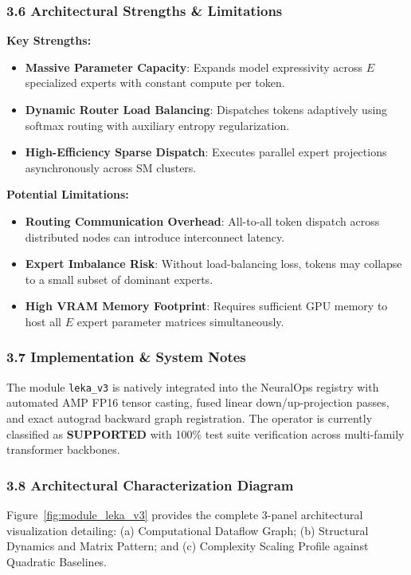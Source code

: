 \subsubsection*{3.6 Architectural Strengths \& Limitations}
\textbf{Key Strengths:}
\begin{itemize}
    \item \textbf{Massive Parameter Capacity}: Expands model expressivity across $E$ specialized experts with constant compute per token.
    \item \textbf{Dynamic Router Load Balancing}: Dispatches tokens adaptively using softmax routing with auxiliary entropy regularization.
    \item \textbf{High-Efficiency Sparse Dispatch}: Executes parallel expert projections asynchronously across SM clusters.
\end{itemize}

\textbf{Potential Limitations:}
\begin{itemize}
    \item \textbf{Routing Communication Overhead}: All-to-all token dispatch across distributed nodes can introduce interconnect latency.
    \item \textbf{Expert Imbalance Risk}: Without load-balancing loss, tokens may collapse to a small subset of dominant experts.
    \item \textbf{High VRAM Memory Footprint}: Requires sufficient GPU memory to host all $E$ expert parameter matrices simultaneously.
\end{itemize}

\subsubsection*{3.7 Implementation \& System Notes}
The module \texttt{leka\_v3} is natively integrated into the NeuralOps registry with automated AMP FP16 tensor casting, fused linear down/up-projection passes, and exact autograd backward graph registration. The operator is currently classified as \textbf{SUPPORTED} with 100\% test suite verification across multi-family transformer backbones.

\subsubsection*{3.8 Architectural Characterization Diagram}
Figure~\ref{fig:module_leka_v3} provides the complete 3-panel architectural visualization detailing: (a) Computational Dataflow Graph; (b) Structural Dynamics and Matrix Pattern; and (c) Complexity Scaling Profile against Quadratic Baselines.


